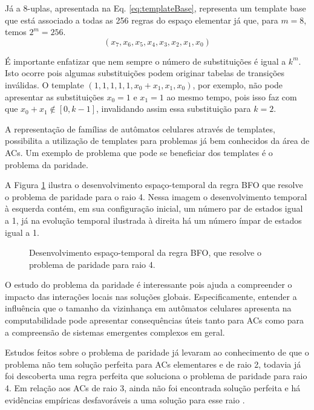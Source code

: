 Já a $8$-uplas, apresentada na Eq. \eqref{eq:templateBase}, representa um template base que está associado a todas as 256 regras do espaço elementar já que, para $m = 8$, temos $2^m = 256 $.
\begin{equation}
(x_7,x_6,x_5,x_4,x_3,x_2,x_1,x_0)
\label{eq:templateBase}
\end{equation}

É importante enfatizar que nem sempre o número de substituições é igual a $k^m$. Isto ocorre pois algumas substituições podem originar tabelas de transições inválidas. O template $(1,1,1,1,1,x_0+x_1,x_1,x_0)$, por exemplo, não pode apresentar as substituições $x_0=1$ e $x_1=1$ ao mesmo tempo, pois isso faz com que $x_0 + x_1 \notin [0, k-1]$, invalidando assim essa substituição para $k=2$.

A representação de famílias de autômatos celulares através de templates, possibilita a utilização de templates para problemas já bem conhecidos da área de ACs. Um exemplo de problema que pode se beneficiar dos templates é o problema da paridade.

A Figura \ref{fig:parity-rule} ilustra o desenvolvimento espaço-temporal da regra BFO \cite{Betel2013} que resolve o problema de paridade para o raio 4. Nessa imagem o desenvolvimento temporal à esquerda contém, em sua configuração inicial, um número par de estados igual a 1, já na evolução temporal ilustrada à direita há um número ímpar de estados igual a 1.

\begin{figure}[h!]
\center
{}
\qquad
{}
\caption{Desenvolvimento espaço-temporal da regra BFO, que resolve o problema de paridade para raio 4. \cite{Betel2013}}
\label{fig:parity-rule}
\end{figure}

O estudo do problema da paridade é interessante pois ajuda a compreender o impacto das interações locais nas soluções globais. Especificamente, entender a influência que o tamanho da vizinhança em autômatos celulares apresenta na computabilidade pode apresentar consequências úteis tanto para ACs como para a compreensão de sistemas emergentes complexos em geral.

Estudos feitos sobre o problema de paridade já levaram ao conhecimento de que o problema não tem solução perfeita para ACs elementares e de raio 2, todavia já foi descoberta uma regra perfeita que soluciona o problema de paridade para raio 4. Em relação aos ACs de raio 3, ainda não foi encontrada solução perfeita e há evidências empíricas desfavoráveis a uma solução para esse raio \cite{Betel2013}.

